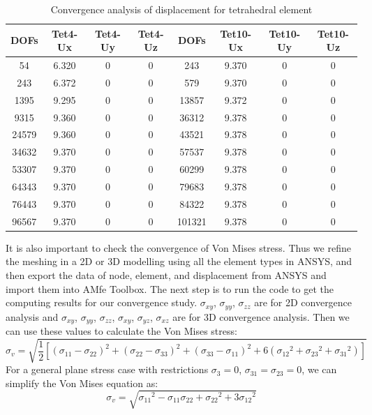 \begin{table}[ht]
	\caption{Convergence analysis of displacement for tetrahedral element} \label{tab: TetConvergence}
	\begin{tabular}{ c | c | c | c | c | c | c | c} 	
		DOFs & Tet4-Ux & Tet4-Uy & Tet4-Uz & DOFs & Tet10-Ux & Tet10-Uy & Tet10-Uz\\ \hline
		54 & 6.320 & 0 & 0 & 243 & 9.370& 0  & 0 \\ 
		243 & 6.372 & 0 & 0 & 579 & 9.370&0 & 0\\
		1395 & 9.295 & 0 & 0 & 13857 & 9.372&  0 & 0 \\
		9315 & 9.360 &  0 &  0 & 36312&9.378 &0 & 0\\
		24579 & 9.360 &  0 &  0 & 43521 & 9.378&0 & 0\\
		34632 & 9.370 &  0 & 0 &  57537 & 9.378&0 & 0  \\
		53307 & 9.370 &   0 & 0 &  60299 & 9.378&0 & 0 \\
		64343 & 9.370 & 0 &  0 & 79683 & 9.378&0 & 0\\
		76443 & 9.370 & 0 & 0 & 84322 & 9.378 &0 & 0 \\
		96567 & 9.370 & 0 & 0 &  101321 & 9.378& 0& 0\\
		\hline  
	\end{tabular}
\end{table}
It is also important to check the convergence of Von Mises stress. Thus we refine the meshing in a 2D or 3D modelling using all the element types in ANSYS, and then export the data of node, element, and displacement from ANSYS and import them into AMfe Toolbox. The next step is to run the code to get the computing results for our convergence study. $\sigma_{xy}$, $\sigma_{yy}$, $\sigma_{zz}$ are for 2D convergence analysis and $\sigma_{xy}$, $\sigma_{yy}$, $\sigma_{zz}$, $\sigma_{xy}$, $\sigma_{yz}$, $\sigma_{xz}$ are for 3D convergence analysis.   Then we can use these values to calculate the Von Mises stress: 
\begin{equation}
\sigma_v = \sqrt{\frac{1}{2}\left[\left(\sigma_{11}-\sigma_{22}\right)^2 + \left(\sigma_{22}-\sigma_{33}\right)^2 + \left(\sigma_{33}-\sigma_{11}\right)^2 + 6\left({\sigma_{12}}^2 + {\sigma_{23}}^2 + {\sigma_{31}}^2 \right) \right]}
\end{equation}
For a general plane stress case with restrictions $\sigma_3 = 0$, $\sigma_{31} = \sigma_{23} = 0$, we can simplify the Von Mises equation as:
\begin{equation}
\sigma_v = \sqrt{{\sigma_{11}}^2 - \sigma_{11}\sigma_{22} + {\sigma_{22}}^2 + 3 {\sigma_{12}}^2}
\end{equation}
